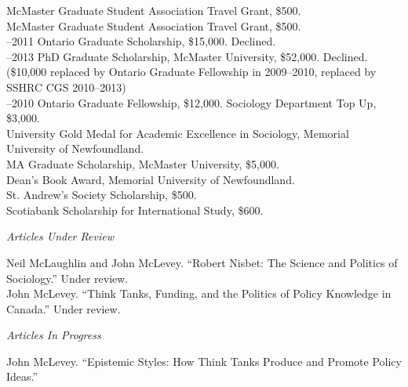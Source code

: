 \documentclass[11pt,usenames,dvipsnames]{article}
\begin{document}
 McMaster Graduate Student Association Travel Grant, \$500.\\

 McMaster Graduate Student Association Travel Grant, \$500.\\

–2011 Ontario Graduate Scholarship, \$15,000. Declined.\\

–2013 PhD Graduate Scholarship, McMaster University, \$52,000. Declined. (\$10,000 replaced by Ontario Graduate Fellowship in 2009–2010, replaced by SSHRC CGS 2010–2013)\\

–2010 Ontario Graduate Fellowship, \$12,000. Sociology Department Top Up, \$3,000.\\

 University Gold Medal for Academic Excellence in Sociology, Memorial University of Newfoundland.\\

 MA Graduate Scholarship, McMaster University, \$5,000.\\

 Dean's Book Award, Memorial University of Newfoundland.\\

 St. Andrew’s Society Scholarship, \$500.\\

 Scotiabank Scholarship for International Study, \$600.\\



\noindent\emph{Articles Under Review \vspace{0.01in}}

\ind Neil McLaughlin and John McLevey. ``Robert Nisbet: The Science and Politics of Sociology.'' Under review.\\

\ind John McLevey. ``Think Tanks, Funding, and the Politics of Policy Knowledge in Canada.'' Under review.\\


\noindent\emph{Articles In Progress \vspace{0.01in}}

\ind John McLevey. ``Epistemic Styles: How Think Tanks Produce and Promote Policy Ideas.''\\
\end{document}
